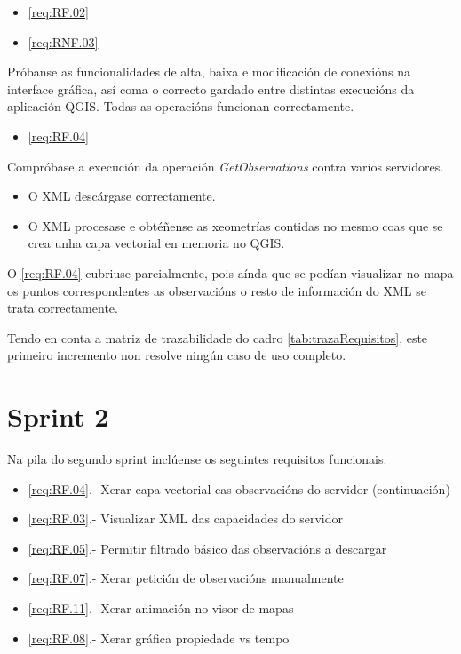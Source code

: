 		  {\begin{itemize}\item \ref{req:RF.02} \item \ref{req:RNF.03}\end{itemize}} %
		  {Próbanse as funcionalidades de alta, baixa e modificación de conexións na interface gráfica, así coma o correcto gardado entre distintas execucións da aplicación QGIS.} %
		  {Todas as operacións funcionan correctamente.} %

		  {\begin{itemize}\item \ref{req:RF.04} \\\end{itemize}} %
		  {Compróbase a execución da operación \emph{GetObservations} contra varios servidores.} %
		  {\begin{itemize}
		  \item O XML descárgase correctamente.
		  \item O XML procesase e obtéñense as xeometrías contidas no mesmo coas que se crea unha capa vectorial en memoria no QGIS.
		  \end{itemize}} %
		  
O \ref{req:RF.04} cubriuse parcialmente, pois aínda que se podían visualizar no mapa os puntos correspondentes as observacións o resto de información do XML se trata correctamente.

Tendo en conta a matriz de trazabilidade do cadro \ref{tab:trazaRequisitos}, este primeiro incremento non resolve ningún caso de uso completo.

\section{Sprint 2}
Na pila do segundo sprint inclúense os seguintes requisitos funcionais:
\begin{itemize}
\item \ref{req:RF.04}.- Xerar capa vectorial cas observacións do servidor (continuación)
\item \ref{req:RF.03}.- Visualizar XML das capacidades do servidor
\item \ref{req:RF.05}.- Permitir filtrado básico das observacións a descargar
\item \ref{req:RF.07}.- Xerar petición de observacións manualmente
\item \ref{req:RF.11}.- Xerar animación no visor de mapas
\item \ref{req:RF.08}.- Xerar gráfica propiedade vs tempo
\end{itemize}

